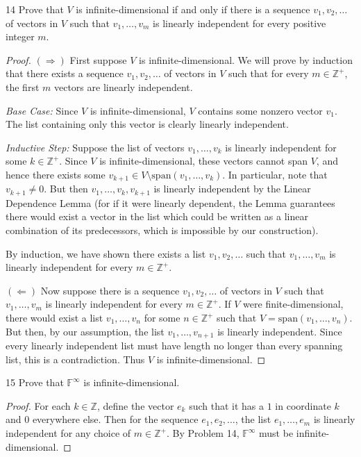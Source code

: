 \documentclass[11pt]{extarticle}
\newenvironment{problem}[1]{\begin{prob*}{#1}{}}{\end{prob*}}
\newcommand{\Z}{\mathbb{Z}}
\newcommand{\F}{\mathbb{F}}
\newcommand{\Span}{\mathrm{span}}
\begin{document}
\begin{problem}{14}
Prove that $V$ is infinite-dimensional if and only if there is a sequence $v_1,v_2,\dots$ of vectors in $V$ such that $v_1,\dots,v_m$ is linearly independent for every positive integer $m$.
\end{problem}
\begin{proof}
$(\Rightarrow)$ First suppose $V$ is infinite-dimensional.  We will prove by induction that there exists a sequence $v_1,v_2,\dots$ of vectors in $V$ such that for every $m\in\Z^+$, the first $m$ vectors are linearly independent.
\par \emph{Base Case:} Since $V$ is infinite-dimensional, $V$ contains some nonzero vector $v_1$.  The list containing only this vector is clearly linearly independent.
\par \emph{Inductive Step:} Suppose the list of vectors $v_1, \dots, v_k$ is linearly independent for some $k\in\Z^+$.  Since $V$ is infinite-dimensional, these vectors cannot span $V$, and hence there exists some $v_{k+1}\in V\setminus \Span(v_1,\dots, v_k)$.  In particular, note that $v_{k+1}\neq 0$.  But then $v_1,\dots, v_k, v_{k+1}$ is linearly independent by the Linear Dependence Lemma (for if it were linearly dependent, the Lemma guarantees there would exist a vector in the list which could be written as a linear combination of its predecessors, which is impossible by our construction).
\par By induction, we have shown there exists a list $v_1,v_2,\dots$ such that $v_1,\dots,v_m$ is linearly independent for every $m\in\Z^+$.
\par $(\Leftarrow)$ Now suppose there is a sequence  $v_1,v_2,\dots$ of vectors in $V$ such that $v_1,\dots,v_m$ is linearly independent for every $m\in\Z^+$.  If $V$ were finite-dimensional, there would exist a list $v_1,\dots, v_n$ for some $n\in\Z^+$ such that $V=\Span(v_1,\dots,v_n)$.  But then, by our assumption, the list $v_1,\dots,v_{n+1}$ is linearly independent.  Since every linearly independent list must have length no longer than every spanning list, this is a contradiction.  Thus $V$ is infinite-dimensional.
\end{proof}

\begin{problem}{15}
Prove that $\F^\infty$ is infinite-dimensional.
\end{problem}
\begin{proof}
For each $k\in\Z$, define the vector $e_k$ such that it has a $1$ in coordinate $k$ and $0$ everywhere else.  Then for the sequence $e_1,e_2,\dots$, the list $e_1,\dots, e_m$ is linearly independent for any choice of $m\in\Z^+$.  By Problem 14, $\F^\infty$ must be infinite-dimensional.
\end{proof}
\end{document}
